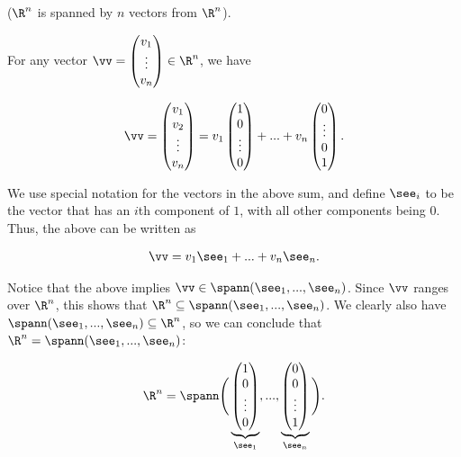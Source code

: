 \begin{deriv}
    ($\R^n$ is spanned by $n$ vectors from $\R^n$).
    
    For any vector $\vv = \begin{pmatrix} v_1 \\ \vdots \\ v_n \end{pmatrix} \in \R^n$, we have
    
    \begin{align*}
        \vv
        =
        \begin{pmatrix} v_1 \\ v_2 \\ \vdots \\ v_n \end{pmatrix}
        =
        v_1 \begin{pmatrix} 1 \\ 0 \\ \vdots \\ 0 \end{pmatrix}
        + ... +
        v_n \begin{pmatrix} 0 \\ \vdots \\ 0 \\ 1 \end{pmatrix}.
    \end{align*}
    
    We use special notation for the vectors in the above sum, and define $\see_i$ to be the vector that has an $i$th component of $1$, with all other components being $0$. Thus, the above can be written as
    
    \begin{align*}
        \vv = v_1 \see_1 + ... + v_n \see_n.
    \end{align*}
    
    Notice that the above implies $\vv \in \spann(\see_1, ..., \see_n)$. Since $\vv$ ranges over $\R^n$, this shows that $\R^n \subseteq \spann(\see_1, ..., \see_n)$. We clearly also have $\spann(\see_1, ..., \see_n) \subseteq \R^n$, so we can conclude that $\R^n = \spann(\see_1, ..., \see_n)$:
    
    \begin{align*}
        \R^n = \spann\Bigg( \underbrace{\begin{pmatrix} 1 \\ 0 \\ \vdots \\ 0 \end{pmatrix}}_{\see_1}, ..., \underbrace{\begin{pmatrix} 0 \\ 0 \\ \vdots \\ 1 \end{pmatrix}}_{\see_n} \Bigg).
    \end{align*}
\end{deriv}

